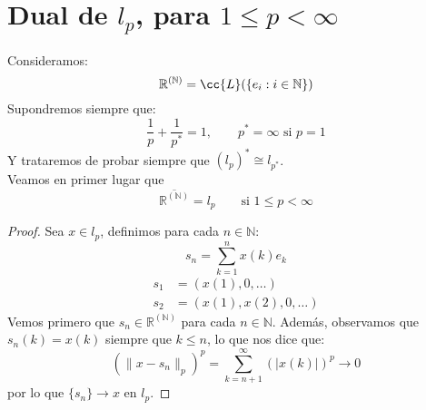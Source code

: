 \section{Dual de $l_p$, para $1\leq p < \infty$}
Consideramos:
\begin{equation*}
    \mathbb{R}^{(\mathbb{N})} = \cc{L}(\{e_i : i \in \mathbb{N}\})
\end{equation*}
Supondremos siempre que:
\begin{equation*}
    \dfrac{1}{p} + \dfrac{1}{p^\ast} = 1, \qquad p^\ast = \infty \text{\ si\ } p = 1
\end{equation*}
Y trataremos de probar siempre que ${(l_p)}^{\ast} \cong l_{p^\ast}$.\\

\noindent
Veamos en primer lugar que
\begin{equation*}
    \overline{\mathbb{R}^{(\mathbb{N})}} = l_p \qquad \text{si\ } 1 \leq p < \infty
\end{equation*}
\begin{proof}
    Sea $x\in l_p$, definimos para cada $n\in \mathbb{N}$:
    \begin{equation*}
        s_n = \sum_{k=1}^{n} x(k)e_k
    \end{equation*}
    \begin{align*}
        s_1 &= (x(1), 0, \ldots) \\
        s_2 &= (x(1), x(2), 0,\ldots)
    \end{align*}
    Vemos primero que $s_n \in \mathbb{R}^{(\mathbb{N})}$ para cada $n\in \mathbb{N}$. Además, observamos que $s_n(k) = x(k)$ siempre que $k\leq n$, lo que nos dice que:
    \begin{equation*}
        {(\|x-s_n\|_p)}^{p} = \sum_{k=n+1}^{\infty} {(|x(k)|)}^{p} \to 0
    \end{equation*}
    por lo que $\{s_n\}\to x$ en $l_p$.
\end{proof}

